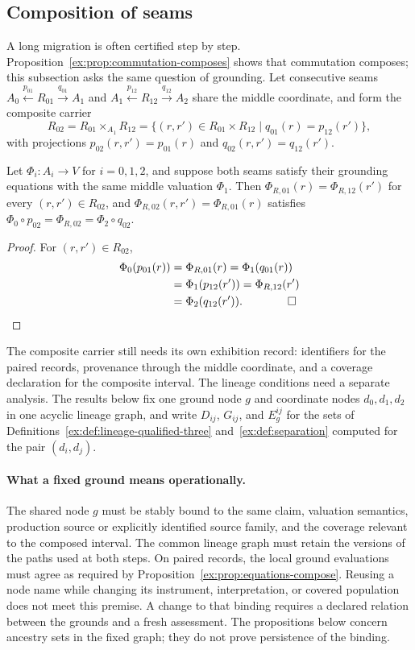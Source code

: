 \documentclass[twocolumn,envcountsect,envcountsame,natbib]{svjour3}
\begin{document}
\subsection{Composition of seams}\label{ex:sec:lineage-composition}

A long migration is often certified step by step. Proposition~\ref{ex:prop:commutation-composes} shows that commutation composes; this subsection asks the same question of grounding. Let consecutive seams $A_0\xleftarrow{p_{01}}R_{01}\xrightarrow{q_{01}}A_1$ and $A_1\xleftarrow{p_{12}}R_{12}\xrightarrow{q_{12}}A_2$ share the middle coordinate, and form the composite carrier
\[
R_{02}=R_{01}\times_{A_1}R_{12}=\{(r,r')\in R_{01}\times R_{12}\mid q_{01}(r)=p_{12}(r')\},
\]
with projections $p_{02}(r,r')=p_{01}(r)$ and $q_{02}(r,r')=q_{12}(r')$.

\begin{proposition}\label{ex:prop:equations-compose}
Let $\Phi_i:A_i\to V$ for $i=0,1,2$, and suppose both seams satisfy their grounding equations with the same middle valuation $\Phi_1$. Then $\Phi_{R,01}(r)=\Phi_{R,12}(r')$ for every $(r,r')\in R_{02}$, and $\Phi_{R,02}(r,r')=\Phi_{R,01}(r)$ satisfies $\Phi_0\circ p_{02}=\Phi_{R,02}=\Phi_2\circ q_{02}$.
\end{proposition}
\begin{proof}
For $(r,r')\in R_{02}$,
\[
\begin{aligned}
\Phi_0(p_{01}(r))&=\Phi_{R,01}(r)=\Phi_1(q_{01}(r))\\
&=\Phi_1(p_{12}(r'))=\Phi_{R,12}(r')\\&=\Phi_2(q_{12}(r')).\qquad\qed
\end{aligned}
\]
\end{proof}

The composite carrier still needs its own exhibition record: identifiers for the paired records, provenance through the middle coordinate, and a coverage declaration for the composite interval. The lineage conditions need a separate analysis. The results below fix one ground node $g$ and coordinate nodes $d_0,d_1,d_2$ in one acyclic lineage graph, and write $D_{ij}$, $G_{ij}$, and $E^{ij}_g$ for the sets of Definitions~\ref{ex:def:lineage-qualified-three} and~\ref{ex:def:separation} computed for the pair $(d_i,d_j)$.

\paragraph{What a fixed ground means operationally.}
The shared node $g$ must be stably bound to the same claim, valuation semantics, production source or explicitly identified source family, and the coverage relevant to the composed interval. The common lineage graph must retain the versions of the paths used at both steps. On paired records, the local ground evaluations must agree as required by Proposition~\ref{ex:prop:equations-compose}. Reusing a node name while changing its instrument, interpretation, or covered population does not meet this premise. A change to that binding requires a declared relation between the grounds and a fresh assessment. The propositions below concern ancestry sets in the fixed graph; they do not prove persistence of the binding.
\end{document}
